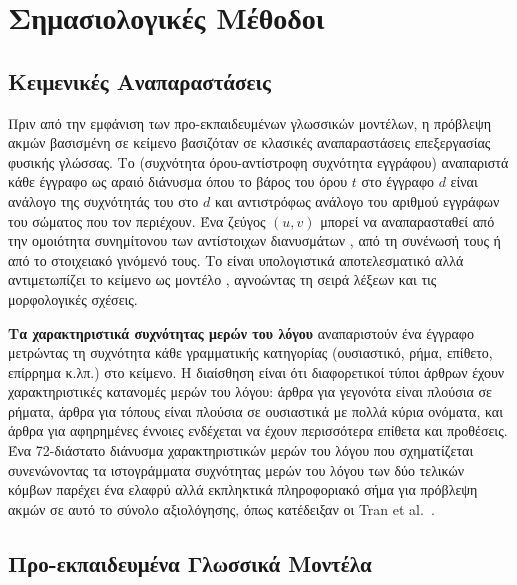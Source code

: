 \section{Σημασιολογικές Μέθοδοι}
\label{sec:semantic-methods}

\subsection{Κειμενικές Αναπαραστάσεις}
\label{subsec:text-representations}

Πριν από την εμφάνιση των προ-εκπαιδευμένων γλωσσικών μοντέλων, η πρόβλεψη ακμών
βασισμένη σε κείμενο βασιζόταν σε κλασικές αναπαραστάσεις επεξεργασίας φυσικής
γλώσσας.
Το \textbf{} \cite{sparckjones1972statistical} (συχνότητα όρου-αντίστροφη συχνότητα εγγράφου)
αναπαριστά κάθε έγγραφο ως αραιό διάνυσμα όπου το βάρος του όρου $t$ στο έγγραφο
$d$ είναι ανάλογο της συχνότητάς του στο $d$ και αντιστρόφως ανάλογο του αριθμού
εγγράφων του σώματος που τον περιέχουν.
Ένα ζεύγος $(u, v)$ μπορεί να αναπαρασταθεί
από την ομοιότητα συνημίτονου των αντίστοιχων διανυσμάτων , από τη
συνένωσή τους ή από το στοιχειακό γινόμενό τους.
Το  είναι υπολογιστικά
αποτελεσματικό αλλά αντιμετωπίζει το κείμενο ως μοντέλο , αγνοώντας τη σειρά
λέξεων και τις μορφολογικές σχέσεις.

\textbf{Τα χαρακτηριστικά συχνότητας μερών του λόγου} αναπαριστούν ένα έγγραφο
μετρώντας τη συχνότητα κάθε γραμματικής κατηγορίας (ουσιαστικό, ρήμα, επίθετο,
επίρρημα κ.λπ.) στο κείμενο.
Η διαίσθηση είναι ότι διαφορετικοί τύποι άρθρων
 έχουν χαρακτηριστικές κατανομές μερών του λόγου: άρθρα για γεγονότα
είναι πλούσια σε ρήματα, άρθρα για τόπους είναι πλούσια σε ουσιαστικά με πολλά
κύρια ονόματα, και άρθρα για αφηρημένες έννοιες ενδέχεται να έχουν περισσότερα
επίθετα και προθέσεις.
Ένα 72-διάστατο διάνυσμα χαρακτηριστικών μερών του λόγου
που σχηματίζεται συνενώνοντας τα ιστογράμματα συχνότητας μερών του λόγου των δύο
τελικών κόμβων παρέχει ένα ελαφρύ αλλά εκπληκτικά πληροφοριακό σήμα για πρόβλεψη
ακμών σε αυτό το σύνολο αξιολόγησης, όπως κατέδειξαν οι Tran et al.\
\cite{tran2023text}.

\subsection{Προ-εκπαιδευμένα Γλωσσικά Μοντέλα}
\label{subsec:pretrained-lms}

